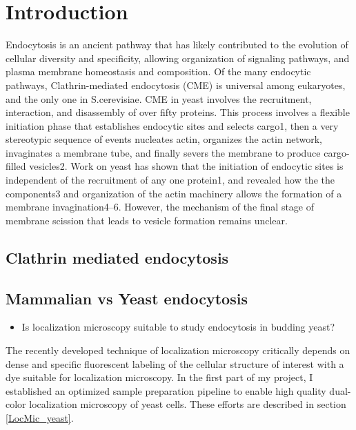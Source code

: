 \chapter{Introduction} %

\label{Ch:Aims} %

Endocytosis is an ancient pathway that has likely contributed to the evolution of cellular diversity and specificity, allowing organization of signaling pathways, and plasma membrane homeostasis and composition. Of the many endocytic pathways, Clathrin-mediated endocytosis (CME) is universal among eukaryotes, and the only one in S.cerevisiae. CME in yeast involves the recruitment, interaction, and disassembly of over fifty proteins. This process involves a flexible initiation phase that establishes endocytic sites and selects cargo1, then a very stereotypic sequence of events nucleates actin, organizes the actin network, invaginates a membrane tube, and finally severs the membrane to produce cargo-filled vesicles2. Work on yeast has shown that the initiation of endocytic sites is independent of the recruitment of any one protein1, and revealed how the the components3 and organization of the actin machinery allows the formation of a membrane invagination4–6. However, the mechanism of the final stage of membrane scission that leads to vesicle formation remains unclear.


	\section{Clathrin mediated endocytosis}
	\section{Mammalian vs Yeast endocytosis}
	
	
\begin{itemize}
	\item Is localization microscopy suitable to study endocytosis in budding yeast?
\end{itemize}

The recently developed technique of localization microscopy critically depends on dense and specific fluorescent labeling of the cellular structure of interest with a dye suitable for localization microscopy. In the first part of my project, I established an optimized sample preparation pipeline to enable high quality dual-color localization microscopy of yeast cells. These efforts are described in section \ref{LocMic_yeast}.

